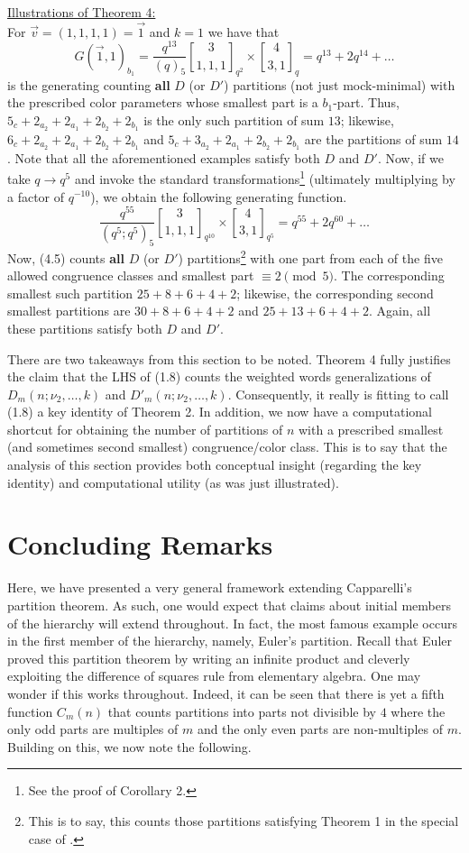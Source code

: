 \documentclass[12pt,a4paper]{amsart}
\theoremstyle{definition}
\theoremstyle{notation}
\theoremstyle{corollary}
\begin{document}
\underline{Illustrations of Theorem 4:}\\
For $\vec{v}=(1,1,1,1)=\vec{1}$ and $k=1$ we have that
\[G(\vec{1},1)_{b_1}=\frac{q^{13}}{(q)_5}{3\brack 1,1,1}_{q^2}\times {4\brack 3,1}_{q}=q^{13}+2q^{14}+\dots\]
is the generating counting \textbf{all} $D$ (or $D'$) partitions (not just mock-minimal) with the prescribed color parameters whose smallest part is a $b_1$-part. Thus, $5_c+2_{a_2}+2_{a_1}+2_{b_2}+2_{b_1}$ is the only such partition of sum $13$; likewise, $6_c+2_{a_2}+2_{a_1}+2_{b_2}+2_{b_1}$ and $5_c+3_{a_2}+2_{a_1}+2_{b_2}+2_{b_1}$ are the partitions of sum $14$. Note that all the aforementioned examples satisfy both $D$ and $D'$.  Now, if we take $q\to q^5$ and invoke the standard transformations\footnote{See the proof of Corollary 2.} (ultimately multiplying by a factor of  $q^{-10}$), we obtain the following generating function.
\[\frac{q^{55}}{(q^5;q^5)_5}{3\brack 1,1,1}_{q^{10}}\times {4\brack 3,1}_{q^5}=q^{55}+2q^{60}+\dots \tag{4.5}\]
Now, (4.5) counts \textbf{all} $D$ (or $D'$) partitions\footnote{This is to say, this counts those partitions satisfying Theorem 1 in the special case of \cite[Thm.~C5]{YAKA25}.} with one part from each of the five allowed congruence classes and smallest part $\equiv2 \pmod{5}$. The corresponding smallest such partition $25+8+6+4+2$; likewise, the corresponding second smallest partitions are $30+8+6+4+2$ and $25+13+6+4+2$. Again, all these partitions satisfy both $D$ and $D'$.
\bigskip


There are two takeaways from this section to be noted. Theorem 4 fully justifies the claim that the LHS of (1.8) counts the weighted words generalizations of $D_m(n;\nu_2,\dots,k)$ and $D'_m(n;\nu_2,\dots,k)$. Consequently, it really is fitting to call (1.8) a key identity of Theorem 2. In addition, we now have a computational shortcut for obtaining the number of partitions of $n$ with a prescribed smallest (and sometimes second smallest) congruence/color class. This is to say that the analysis of this section provides both conceptual insight (regarding the key identity) and computational utility (as was just illustrated). 
\section{Concluding Remarks}
Here, we have presented a very general framework extending Capparelli's partition theorem. As such, one would expect that claims about initial members of the hierarchy will extend throughout. In fact, the most famous example occurs in the first member of the hierarchy, namely, Euler's partition. Recall that Euler proved this partition theorem by writing an infinite product and cleverly exploiting the difference of squares rule from elementary algebra. One may wonder if this works throughout. Indeed, it can be seen that there is yet a fifth function $C_m(n)$ that counts partitions into parts not divisible by $4$ where the only odd parts are multiples of $m$ and the only even parts are non-multiples of $m$. Building on this, we now note the following.\\
\end{document}
